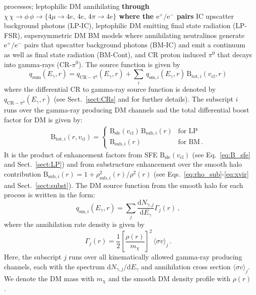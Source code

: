 \documentclass[10pt,aps,pra,reprint,amsmath,amsfonts,amssymb,showpacs,nofootinbib,floatfix]{revtex4-1}
\def\C#1{{\bf #1}}
\newcommand{\rmn}{\mathrm}
\newcommand{\sfe}{\rmn{sfe}}
\newcommand{\sub}{\rmn{sub}}
\newcommand{\B}{\rmn{B}}
\newcommand{\qCR}{q_{\rmn{CR}-\ensuremath{\pi^0}}}
\newcommand{\dd}{\rmn{d}}
\newcommand{\mx}{\ensuremath{m_{\chi}}}
\newcommand{\ngammaj}{\ensuremath{N_{\gamma,j}}}
\newcommand{\sigmaannv}{\ensuremath{\langle\sigma v\rangle}}
\newcommand{\sigv}{v_\rmn{cl}}
\newcommand{\egamma}{\ensuremath{E_{\gamma}}}
\newcommand{\eg}{E_\gamma}
\begin{document}
processes; leptophilic DM annihilating \C{through
  $\chi\,\chi\to\phi\,\phi\to\{4\mu\to4e,\,4e,\,4\pi\to4e\}$ where the
  $\rmn{e}^+/\rmn{e}^-$ pairs} IC upscatter background photons
(LP-IC), leptophilic DM emitting final state radiation (LP-FSR),
supersymmetric DM BM models where annihilating neutralinos generate
$\rmn{e}^+/\rmn{e}^-$ pairs that upscatter background photons (BM-IC)
and emit a continuum as well as final state radiation (BM-Cont), and
CR proton induced $\pi^0$ that decays into gamma-rays
(CR-$\pi^0$). The source function is given by
\begin{equation}
q_\rmn{sum} (\eg,r) = \qCR(\eg,r)+
\sum_i \,q_{\rmn{sm},i}(\eg,r)\,\B_{\rmn{tot},i}(\sigv,r)
\end{equation}
where the differential CR to gamma-ray source function is denoted
by $\qCR(\eg,r)$ (see Sect.~\ref{sect:CRs} and
\cite{2010MNRAS.409..449P} for further details). The subscript $i$
runs over the gamma-ray producing DM channels and the total
differential boost factor for DM is given by:
\begin{eqnarray}
\B_{\rmn{tot},i}(r,\sigv) = \left\{\begin{array}{cc}
\B_\sfe(\sigv)\,\B_{\sub,i}(r) &\rmn{for\,\,LP}\\
\B_{\sub,i}(r) &\rmn{for\,\,BM\,.}\end{array}\right.
\end{eqnarray}
It is the product of enhancement factors from SFE $\B_\sfe(\sigv)$
(see Eq.~\ref{eq:B_sfe} and Sect.~\ref{sect:LP}) and from substructure
enhancement over the smooth halo contribution $\B_{\sub,i}(r) =
1+\rho_{\sub,i}^2(r)/\rho^2(r)$ (see
Eqs.~\ref{eq:rho_sub}-\ref{eq:xvir} and Sect.~\ref{sect:subst}).  The
DM source function from the smooth halo for each process is written in
the form:
\begin{equation}
\label{eq:q_sm}
q_{\rmn{sm},i} (\egamma,r) = \sum_j
\frac{\dd \ngammaj}{\dd E_\gamma} \Gamma_j(r)\,,
\end{equation}
where the annihilation rate density is given by 
\begin{equation}
\label{eq:ann_rate}
\Gamma_j(r) = \frac{1}{2} \left[\frac{\rho(r)}{\mx}\right]^2 
\, \sigmaannv_j\,.
\end{equation}
Here, the subscript $j$ runs over all kinematically allowed gamma-ray
producing channels, each with the spectrum $\dd
  \ngammaj /\dd\eg$ and annihilation cross section $\sigmaannv_j$.
We denote the DM mass with $\mx$ and the smooth DM density profile
with $\rho(r)$.
\end{document}
